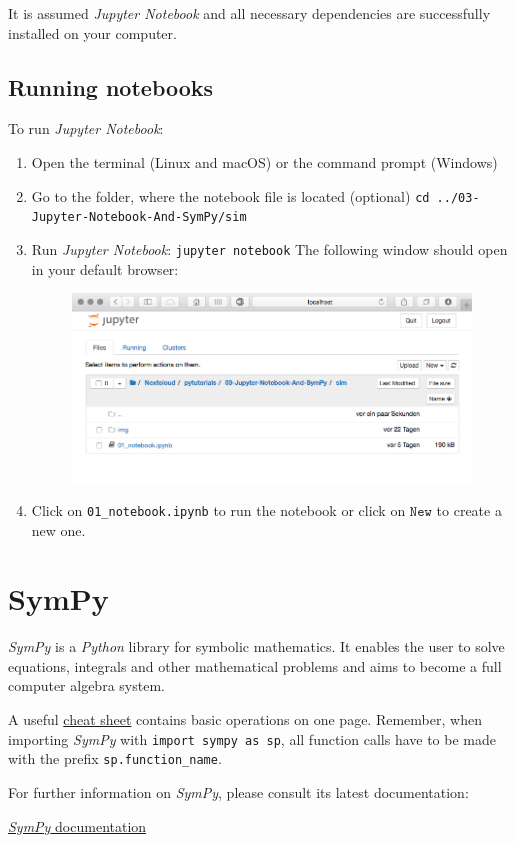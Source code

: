 \documentclass[a4paper,11pt,headings=standardclasses,parskip=half]{scrartcl}
\newcommand{\py}{\emph{Python}\xspace}
\newcommand{\jp}{\emph{Jupyter Notebook}\xspace}
\newcommand{\sympy}{\emph{SymPy}\xspace}
\begin{document}
It is assumed \jp and all necessary dependencies are successfully installed on your computer.
\subsection{Running notebooks}
To run \jp:
\begin{enumerate}
\item Open the terminal (Linux and macOS) or the command prompt (Windows)
\item Go to the folder, where the notebook file is located (optional)
	\subitem \texttt{cd ../03-Jupyter-Notebook-And-SymPy/sim}
\item Run \jp: 
	\subitem \texttt{jupyter notebook}
	\subitem The following window should open in your default browser:
\begin{figure}[htb]
\centering
\includegraphics[scale=0.4]{img/jupyter_screenshot}
\end{figure}
\item Click on \texttt{01\_notebook.ipynb} to run the notebook or click on $\texttt{New}$ to create a new one.
\end{enumerate}  
\newpage
\section{SymPy}
\sympy is a \py library for symbolic mathematics. It enables the user to solve equations, integrals and other mathematical problems and aims to become a full computer algebra system.

A useful \href{http://daabzlatex.s3.amazonaws.com/9065616cce623384fe5394eddfea4c52.pdf}{cheat sheet} contains basic operations on one page. Remember, when importing \sympy with \texttt{import sympy as sp}, all function calls have to be made with the prefix \texttt{sp.function\_name}.

For further information on \sympy, please consult its latest documentation:

\href{http://docs.sympy.org/latest/index.html}{\sympy documentation} 
\end{document}
